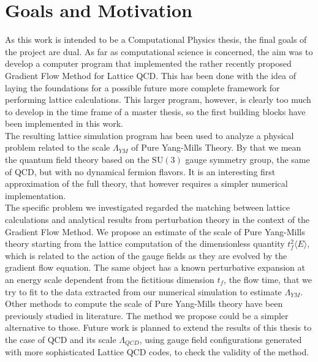 \section{Goals and Motivation}
As this work is intended to be a Computational Physics thesis, the final goals of the project are dual. As far as computational science is concerned, the aim was to develop a computer program that implemented the rather recently proposed Gradient Flow Method \cite{luscher_properties_2010} for Lattice QCD. This has been done with the idea of laying the foundations for a possible future more complete framework for performing lattice calculations. This larger program, however, is clearly too much to develop in the time frame of a master thesis, so the first building blocks have been implemented in this work.\\
The resulting lattice simulation program has been used to analyze a physical problem related to the scale $\Lambda_{YM}$ of Pure Yang-Mills Theory. By that we mean the quantum field theory based on the $\mathrm{SU}(3)$ gauge symmetry group, the same of QCD, but with no dynamical fermion flavors. It is an interesting first approximation of the full theory, that however requires a simpler numerical implementation. \\
The specific problem we investigated regarded the matching between lattice calculations and analytical results from perturbation theory in the context of the Gradient Flow Method. We propose an estimate of the scale of Pure Yang-Mills theory starting from the lattice computation of the dimensionless quantity $t_f^2\langle E\rangle$, which is related to the action of the gauge fields as they are evolved by the gradient flow equation. The same object has a known perturbative expansion at an energy scale dependent from the fictitious dimension $t_f$, the flow time, that we try to fit to the data extracted from our numerical simulation to estimate $\Lambda_{YM}$. \\
Other methods to compute the scale of Pure Yang-Mills theory have been previously studied in literature. The method we propose could be a simpler alternative to those. Future work is planned to extend the results of this thesis to the case of QCD and its scale $\Lambda_{QCD}$, using gauge field configurations generated with more sophisticated Lattice QCD codes, to check the validity of the method.

